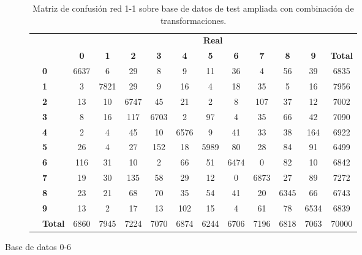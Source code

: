 \begin{description}
	\begin{table}[H]
		\centering
		\begin{tabular}{|c|l|c|c|c|c|c|c|c|c|c|c|c|}
			\cline{3-13} 
			\multicolumn{2}{c|}{} & \multicolumn{11}{c|}{\textbf{Real}} \\ \cline{3-13} 
			\multicolumn{2}{c|}{} & \textbf{0} & \textbf{1} & \textbf{2} &  \textbf{3} & \textbf{4} & \textbf{5} & \textbf{6} & \textbf{7} & \textbf{8} & \textbf{9} & \textbf{Total}\\ \hline
			\multirow{10}{0.5cm}{\rotatebox{90}{\textbf{Predicción}}}& \textbf{0} & \cellcolor{lightgray}6637 & 6 & 29 & 8 & 9 & 11 & 36 & 4 & 56 & 39 & 6835\\ \cline{2-13}
			& \textbf{1} & 3 & \cellcolor{lightgray}7821 & 29 & 9 & 16 & 4 & 18 & 35 & 5 & 16 & 7956\\ \cline{2-13}
			& \textbf{2} & 13 & 10 & \cellcolor{lightgray}6747 & 45 & 21 & 2 & 8 & 107 & 37 & 12 & 7002\\ \cline{2-13}
			& \textbf{3} & 8 & 16 & 117 & \cellcolor{lightgray}6703 & 2 & 97 & 4 & 35 & 66 & 42 & 7090\\ \cline{2-13}
			& \textbf{4} & 2 & 4 & 45 & 10 & \cellcolor{lightgray}6576 & 9 & 41 & 33 & 38 & 164 & 6922\\ \cline{2-13}
			& \textbf{5} & 26 & 4 & 27 & 152 & 18 & \cellcolor{lightgray}5989 & 80 & 28 & 84 & 91 & 6499\\ \cline{2-13}
			& \textbf{6} & 116 & 31 & 10 & 2 & 66 & 51 & \cellcolor{lightgray}6474 & 0 & 82 & 10 & 6842\\ \cline{2-13}
			& \textbf{7} & 19 & 30 & 135 & 58 & 29 & 12 & 0 & \cellcolor{lightgray}6873 & 27 & 89 & 7272\\ \cline{2-13}
			& \textbf{8} & 23 & 21 & 68 & 70 & 35 & 54 & 41 & 20 & \cellcolor{lightgray}6345 & 66 & 6743\\ \cline{2-13}
			& \textbf{9} & 13 & 2 & 17 & 13 & 102 & 15 & 4 & 61 & 78 & \cellcolor{lightgray}6534 & 6839\\ \cline{2-13}
			& \textbf{Total} & 6860 & 7945 & 7224 & 7070 & 6874 & 6244 & 6706 & 7196 & 6818 & 7063 & 70000\\ \hline
		\end{tabular}
		\caption{Matriz de confusión red 1-1 sobre base de datos de test ampliada con combinación de transformaciones.}
		\label{tab.matriz1-1}
	\end{table}
	\item[Base de datos 0-6] \hfill 
	\vspace{10pt}
	\\

\end{description}
